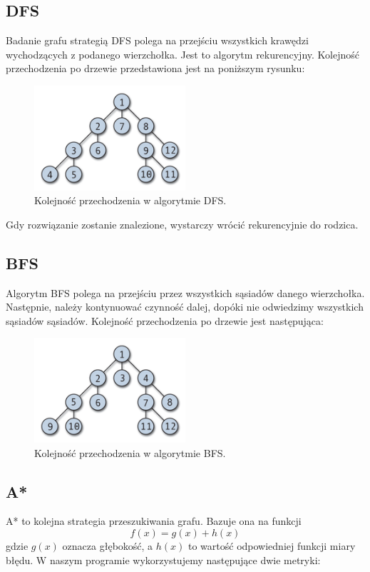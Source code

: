 \documentclass{classrep}
\begin{document}
\subsection{DFS}
Badanie grafu strategią DFS polega na przejściu wszystkich krawędzi wychodzących z podanego wierzchołka. Jest to algorytm rekurencyjny. Kolejność przechodzenia po drzewie przedstawiona jest na poniższym rysunku:
 \begin{figure}[h!]
    \centering
    \includegraphics[width=0.5\textwidth]{dfs.png}
    \caption{Kolejność przechodzenia w algorytmie DFS. \cite{wikiDFS}}
\end{figure}

Gdy rozwiązanie zostanie znalezione, wystarczy wrócić rekurencyjnie do rodzica.

\subsection{BFS}
Algorytm BFS polega na przejściu przez wszystkich sąsiadów danego wierzchołka. Następnie, należy kontynuować czynność dalej, dopóki nie odwiedzimy wszystkich sąsiadów sąsiadów. Kolejność przechodzenia po drzewie jest następująca:
\begin{figure}[h!]
    \centering
    \includegraphics[width=0.5\textwidth]{bfs.png}
    \caption{Kolejność przechodzenia w algorytmie BFS. \cite{wikiBFS}}
\end{figure}

\subsection{A*}
A* to kolejna strategia przeszukiwania grafu. Bazuje ona na funkcji 
\begin{equation}
f(x) = g(x) + h(x) 
\label{fun}
\end{equation}
gdzie $g(x)$ oznacza głębokość, a $h(x)$ to wartość odpowiedniej funkcji miary błędu. W naszym programie wykorzystujemy następujące dwie metryki:
\end{document}
